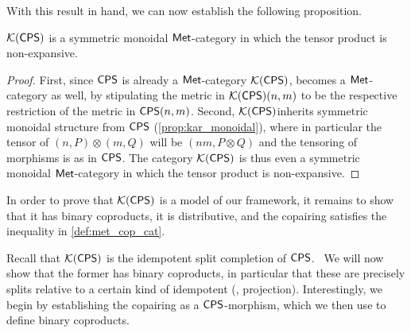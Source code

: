 With this result in hand, we can now establish the following proposition.

\begin{proposition} \label{prop:kar_monoidal_met}
  $\mathcal{K}{(\mathsf{CPS})}$ is a symmetric monoidal $\mathsf{Met}$-category in which the tensor product is non-expansive.
\end{proposition}

\begin{proof}
 First, since $\mathsf{CPS}$ is already a $\mathsf{Met}$-category $\mathcal{K}{(\mathsf{CPS})}$, becomes
a $\mathsf{Met}$-category as well, by stipulating the metric in $\mathcal{K}{(\mathsf{CPS})}(n,m)$ to be
the respective restriction of the metric in $\mathsf{CPS}(n,m)$. 
Second, $\mathcal{K}{(\mathsf{CPS})}$inherits symmetric monoidal structure from $\mathsf{CPS}$ (\autoref{prop:kar_monoidal}), where in particular the tensor of
$(n,P) \otimes (m,Q)$ will be $(n m , P \otimes Q)$ and the tensoring of
morphisms is as in $\mathsf{CPS}$. The category $\mathcal{K}{(\mathsf{CPS})}$ is thus even a
symmetric monoidal $\mathsf{Met}$-category in which the tensor product is non-expansive. 
\end{proof}

In order to prove that $\mathcal{K}{(\mathsf{CPS})}$ is a model of our framework, it remains to show that it has binary coproducts, it is distributive, and the copairing satisfies the inequality in \autoref{def:met_cop_cat}.

Recall that $\mathcal{K}{(\mathsf{CPS})}$ is the idempotent split completion of $\mathsf{CPS}$.  We will now show that the former has binary coproducts, in particular that these are precisely splits relative to a certain kind of idempotent (\ie, projection).
Interestingly, we begin by establishing the copairing as a $\mathsf{CPS}$-morphism, which we then use to define binary coproducts. 

